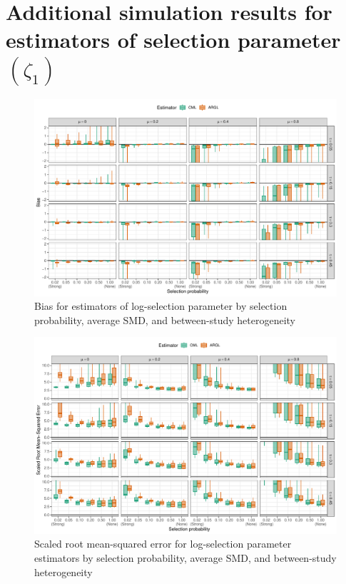 \documentclass[
  american,
  man, donotrepeattitle,floatsintext]{apa7}
\begin{document}
\section{\texorpdfstring{Additional simulation results for estimators of selection parameter \((\zeta_1)\)}{Additional simulation results for estimators of selection parameter (\textbackslash zeta\_1)}}\label{zeta-simulation-results}

\begin{figure}
\includegraphics{step-function-selection-models-with-dependent-effects_files/figure-latex/selection-bias-1} \caption{Bias for estimators of log-selection parameter by selection probability, average SMD, and between-study heterogeneity}\label{fig:selection-bias}
\end{figure}

\begin{figure}
\includegraphics{step-function-selection-models-with-dependent-effects_files/figure-latex/selection-rmse-1} \caption{Scaled root mean-squared error for log-selection parameter estimators by selection probability, average SMD, and between-study heterogeneity}\label{fig:selection-rmse}
\end{figure}
\end{document}
